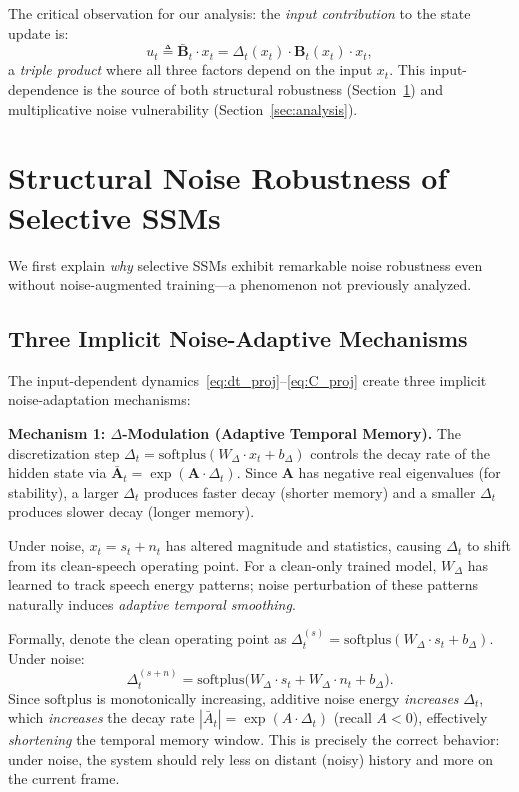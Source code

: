 \documentclass[journal]{IEEEtran}
\begin{document}
The critical observation for our analysis: the \emph{input contribution} to the state update is:
\begin{equation}
\boxed{u_t \triangleq \bar{\mathbf{B}}_t \cdot x_t = \Delta_t(x_t) \cdot \mathbf{B}_t(x_t) \cdot x_t,}
\label{eq:triple_product}
\end{equation}
a \emph{triple product} where all three factors depend on the input $x_t$.
This input-dependence is the source of both structural robustness (Section~\ref{sec:structural}) and multiplicative noise vulnerability (Section~\ref{sec:analysis}).


\section{Structural Noise Robustness of Selective SSMs}
\label{sec:structural}

We first explain \emph{why} selective SSMs exhibit remarkable noise robustness even without noise-augmented training---a phenomenon not previously analyzed.

\subsection{Three Implicit Noise-Adaptive Mechanisms}
\label{sec:ssm_dynamics}

The input-dependent dynamics~\eqref{eq:dt_proj}--\eqref{eq:C_proj} create three implicit noise-adaptation mechanisms:

\smallskip\noindent\textbf{Mechanism 1: $\Delta$-Modulation (Adaptive Temporal Memory).}
The discretization step $\Delta_t = \text{softplus}(W_\Delta \cdot x_t + b_\Delta)$ controls the decay rate of the hidden state via $\bar{\mathbf{A}}_t = \exp(\mathbf{A} \cdot \Delta_t)$.
Since $\mathbf{A}$ has negative real eigenvalues (for stability), a larger $\Delta_t$ produces faster decay (shorter memory) and a smaller $\Delta_t$ produces slower decay (longer memory).

Under noise, $x_t = s_t + n_t$ has altered magnitude and statistics, causing $\Delta_t$ to shift from its clean-speech operating point.
For a clean-only trained model, $W_\Delta$ has learned to track speech energy patterns; noise perturbation of these patterns naturally induces \emph{adaptive temporal smoothing}.

Formally, denote the clean operating point as $\Delta^{(s)}_t = \text{softplus}(W_\Delta \cdot s_t + b_\Delta)$.
Under noise:
\begin{equation}
\Delta^{(s+n)}_t = \text{softplus}\big(W_\Delta \cdot s_t + W_\Delta \cdot n_t + b_\Delta\big).
\label{eq:delta_noise}
\end{equation}
Since $\text{softplus}$ is monotonically increasing, additive noise energy \emph{increases} $\Delta_t$, which \emph{increases} the decay rate $|\bar{A}_t| = \exp(A \cdot \Delta_t)$ (recall $A < 0$), effectively \emph{shortening} the temporal memory window.
This is precisely the correct behavior: under noise, the system should rely less on distant (noisy) history and more on the current frame.
\end{document}
